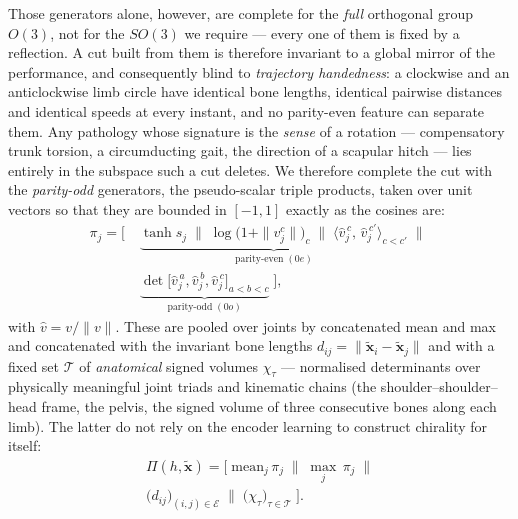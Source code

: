 \documentclass[10pt,journal]{IEEEtran}
\begin{document}
Those generators alone, however, are complete for the \emph{full} orthogonal group $O(3)$, not for the
$SO(3)$ we require --- every one of them is fixed by a reflection. A cut built from them is therefore
invariant to a global mirror of the performance, and consequently blind to \emph{trajectory
handedness}: a clockwise and an anticlockwise limb circle have identical bone lengths, identical
pairwise distances and identical speeds at every instant, and no parity-even feature can separate
them. Any pathology whose signature is the \emph{sense} of a rotation --- compensatory trunk torsion,
a circumducting gait, the direction of a scapular hitch --- lies entirely in the subspace such a cut
deletes. We therefore complete the cut with the \emph{parity-odd} generators, the pseudo-scalar triple
products, taken over unit vectors so that they are bounded in $[-1,1]$ exactly as the cosines are:
%
\begin{equation}
\label{eq:cut}
\begin{aligned}
\pi_j=\Big[\;
&\underbrace{\tanh s_j \;\big\|\; \log\big(1+\|v_j^{c}\|\big)_{c} \;\big\|\;
\big\langle \hat v_j^{\,c},\,\hat v_j^{\,c'}\big\rangle_{c<c'}}_{\text{parity-even}\;(0e)}
\;\big\|\;\\[-2pt]
&\underbrace{\det\big[\hat v_j^{\,a},\hat v_j^{\,b},\hat v_j^{\,c}\big]_{a<b<c}}_{\text{parity-odd}\;(0o)}
\;\Big],
\end{aligned}
\end{equation}
%
with $\hat v = v/\|v\|$. These are pooled over joints by concatenated mean and max and concatenated
with the invariant bone lengths $d_{ij}=\|\tilde{\bm{x}}_{i}-\tilde{\bm{x}}_{j}\|$ and with a fixed set
$\mathcal{T}$ of \emph{anatomical} signed volumes $\chi_\tau$ --- normalised determinants over
physically meaningful joint triads and kinematic chains (the shoulder--shoulder--head frame, the
pelvis, the signed volume of three consecutive bones along each limb). The latter do not rely on the
encoder learning to construct chirality for itself:
%
\begin{equation}
\label{eq:pi}
\begin{gathered}
\Pi(h,\tilde{\bm{x}})=\Big[\;\mathrm{mean}_j\,\pi_j \;\big\|\; \max_j\,\pi_j \;\big\|\\[2pt]
\big(d_{ij}\big)_{(i,j)\in\mathcal{E}}\;\big\|\;\big(\chi_\tau\big)_{\tau\in\mathcal{T}}\;\Big].
\end{gathered}
\end{equation}
\end{document}
